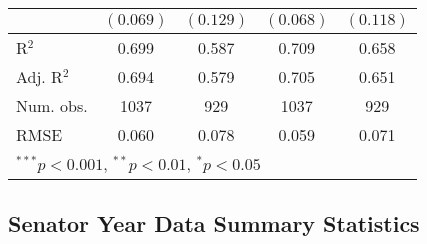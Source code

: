 \documentclass[12pt]{article}
\begin{document}
\begin{table}
\begin{center}
\begin{tabular}{l c c c c }
			& $(0.069)$      & $(0.129)$      & $(0.068)$      & $(0.118)$      \\
			\hline
			R$^2$                         & 0.699          & 0.587          & 0.709          & 0.658          \\
			Adj. R$^2$                    & 0.694          & 0.579          & 0.705          & 0.651          \\
			Num. obs.                     & 1037           & 929            & 1037           & 929            \\
			RMSE                          & 0.060          & 0.078          & 0.059          & 0.071          \\
			\hline
			\multicolumn{5}{l}{\scriptsize{$^{***}p<0.001$, $^{**}p<0.01$, $^*p<0.05$}}
		\end{tabular}
	\end{center}
\end{table}

\clearpage

\pagebreak

\subsection{Senator Year Data Summary Statistics}
\end{document}
